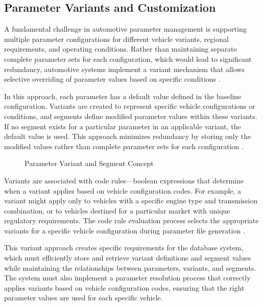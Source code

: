 \subsection{Parameter Variants and Customization}
\label{subsec:parameter-variants}

A fundamental challenge in automotive parameter management is supporting multiple parameter configurations for different vehicle variants, regional requirements, and operating conditions. Rather than maintaining separate complete parameter sets for each configuration, which would lead to significant redundancy, automotive systems implement a variant mechanism that allows selective overriding of parameter values based on specific conditions \cite{staron2021automotive}.

In this approach, each parameter has a default value defined in the baseline configuration. Variants are created to represent specific vehicle configurations or conditions, and segments define modified parameter values within these variants. If no segment exists for a particular parameter in an applicable variant, the default value is used. This approach minimizes redundancy by storing only the modified values rather than complete parameter sets for each configuration \cite{broy2006challenges}.

\begin{figure}[ht]
    \centering
    \caption{Parameter Variant and Segment Concept}
    \label{fig:variant-concept}
\end{figure}

Variants are associated with code rules—boolean expressions that determine when a variant applies based on vehicle configuration codes. For example, a variant might apply only to vehicles with a specific engine type and transmission combination, or to vehicles destined for a particular market with unique regulatory requirements. The code rule evaluation process selects the appropriate variants for a specific vehicle configuration during parameter file generation \cite{staron2021autosar}.

This variant approach creates specific requirements for the database system, which must efficiently store and retrieve variant definitions and segment values while maintaining the relationships between parameters, variants, and segments. The system must also implement a parameter resolution process that correctly applies variants based on vehicle configuration codes, ensuring that the right parameter values are used for each specific vehicle.

